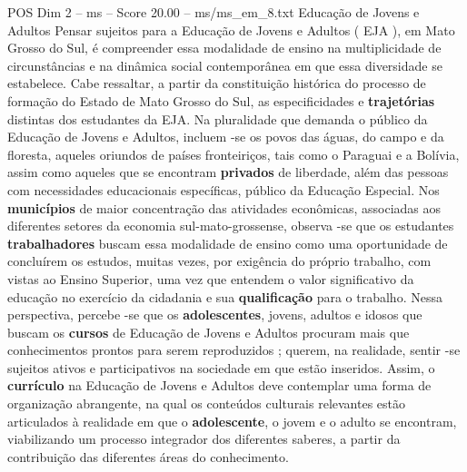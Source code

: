 \begin{textsample}{POS Dim 2 – ms – Score 20.00 – ms/ms\_em\_8.txt}
Educação de Jovens e Adultos Pensar sujeitos para a Educação de Jovens e Adultos ( EJA ), em Mato Grosso do Sul, é compreender essa modalidade de ensino na multiplicidade de circunstâncias e na dinâmica social contemporânea em que essa diversidade se estabelece.
Cabe ressaltar, a partir da constituição histórica do processo de formação do Estado de Mato Grosso do Sul, as especificidades e \textbf{trajetórias} distintas dos estudantes da EJA.
Na pluralidade que demanda o público da Educação de Jovens e Adultos, incluem -se os povos das águas, do campo e da floresta, aqueles oriundos de países fronteiriços, tais como o Paraguai e a Bolívia, assim como aqueles que se encontram \textbf{privados} de liberdade, além das pessoas com necessidades educacionais específicas, público da Educação Especial.
Nos \textbf{municípios} de maior concentração das atividades econômicas, associadas aos diferentes setores da economia sul-mato-grossense, observa -se que os estudantes \textbf{trabalhadores} buscam essa modalidade de ensino como uma oportunidade de concluírem os estudos, muitas vezes, por exigência do próprio trabalho, com vistas ao Ensino Superior, uma vez que entendem o valor significativo da educação no exercício da cidadania e sua \textbf{qualificação} para o trabalho.
Nessa perspectiva, percebe -se que os \textbf{adolescentes}, jovens, adultos e idosos que buscam os \textbf{cursos} de Educação de Jovens e Adultos procuram mais que conhecimentos prontos para serem reproduzidos ; querem, na realidade, sentir -se sujeitos ativos e participativos na sociedade em que estão inseridos.
Assim, o \textbf{currículo} na Educação de Jovens e Adultos deve contemplar uma forma de organização abrangente, na qual os conteúdos culturais relevantes estão articulados à realidade em que o \textbf{adolescente}, o jovem e o adulto se encontram, viabilizando um processo integrador dos diferentes saberes, a partir da contribuição das diferentes áreas do conhecimento.

\end{textsample}
